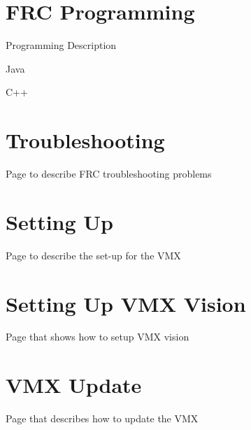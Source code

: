 \documentclass[letterpaper,10pt,english]{sphinxmanual}
\begin{document}
\chapter{FRC Programming}
\label{\detokenize{docs/FRCTraining/programming:frc-programming}}\label{\detokenize{docs/FRCTraining/programming::doc}}
Programming Description

Java

C++

\begin{sphinxVerbatim}[commandchars=\\\{\}]
     
\end{sphinxVerbatim}

\begin{sphinxVerbatim}[commandchars=\\\{\}]
   
\end{sphinxVerbatim}


\chapter{Troubleshooting}
\label{\detokenize{docs/FRCTraining/troubleshooting:troubleshooting}}\label{\detokenize{docs/FRCTraining/troubleshooting::doc}}
Page to describe FRC troubleshooting problems


\chapter{Setting Up}
\label{\detokenize{docs/VMX/setup:setting-up}}\label{\detokenize{docs/VMX/setup::doc}}
Page to describe the set-up for the VMX


\chapter{Setting Up VMX Vision}
\label{\detokenize{docs/VMX/vision:setting-up-vmx-vision}}\label{\detokenize{docs/VMX/vision::doc}}
Page that shows how to setup VMX vision


\chapter{VMX Update}
\label{\detokenize{docs/VMX/update:vmx-update}}\label{\detokenize{docs/VMX/update::doc}}
Page that describes how to update the VMX
\end{document}
